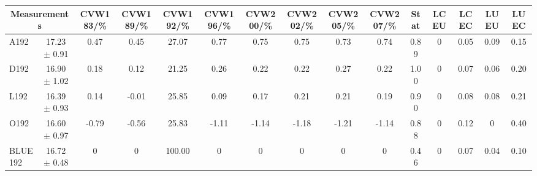 \begin{table}[H]
\scriptsize
\begin{center}
\renewcommand{\arraystretch}{1.1}
\begin{tabular}{|lc|c|c|c|c|c|c|c|c|ccccc|}
\hline
\multicolumn{2}{|c|}{Measurements} & CVW{\tiny 183}/\%  & CVW{\tiny 189}/\%  & CVW{\tiny 192}/\%  & CVW{\tiny 196}/\%  & CVW{\tiny 200}/\%  & CVW{\tiny 202}/\%  & CVW{\tiny 205}/\%  & CVW{\tiny 207}/\%  & {\tiny Stat} & {\tiny LCEU} & {\tiny LCEC} & {\tiny LUEU} & {\tiny LUEC}\\
\hline
A192 &      17.23 $\pm$       0.91 &       0.47 &       0.45 &      27.07 &       0.77 &       0.75 &       0.75 &       0.73 &       0.74 &       0.89 &  0 &       0.05 &       0.09 &       0.15\\
D192 &      16.90 $\pm$       1.02 &       0.18 &       0.12 &      21.25 &       0.26 &       0.22 &       0.22 &       0.27 &       0.22 &       1.00 &  0 &       0.07 &       0.06 &       0.20\\
L192 &      16.39 $\pm$       0.93 &       0.14 &      -0.01 &      25.85 &       0.09 &       0.17 &       0.21 &       0.21 &       0.19 &       0.90 &  0 &       0.08 &       0.08 &       0.21\\
O192 &      16.60 $\pm$       0.97 &      -0.79 &      -0.56 &      25.83 &      -1.11 &      -1.14 &      -1.18 &      -1.21 &      -1.14 &       0.88 &  0 &       0.12 &  0 &       0.40\\
\hline
BLUE {\tiny 192} &      16.72 $\pm$       0.48 &  0 &  0 &     100.00 &  0 &  0 &  0 &  0 &  0 &       0.46 &  0 &       0.07 &       0.04 &       0.10\\
\hline
\end{tabular}
\renewcommand{\arraystretch}{1}
\end{center}
\end{table}
\vspace*{-0.5cm}
